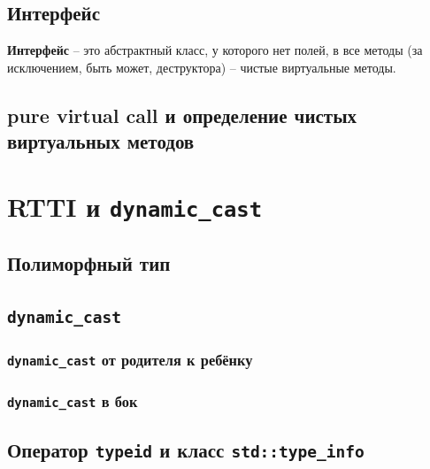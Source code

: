 \documentclass{article}
\begin{document}
\subsection*{Интерфейс}
\textbf{Интерфейс} -- это абстрактный класс, у которого нет полей, в все методы (за исключением, быть может, деструктора) -- чистые виртуальные методы.

\subsection*{pure virtual call и определение чистых виртуальных методов}


\section*{RTTI и \texttt{dynamic\_cast}}
\subsection*{Полиморфный тип}
\subsection*{\texttt{dynamic\_cast}}

\subsubsection*{\texttt{dynamic\_cast} от родителя к ребёнку}
\subsubsection*{\texttt{dynamic\_cast} в бок}

\subsection*{Оператор \texttt{typeid} и класс \texttt{std::type\_info}}
\end{document}

